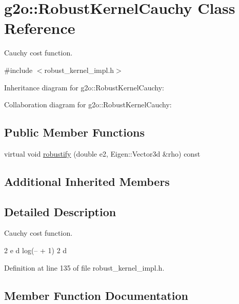 \hypertarget{classg2o_1_1RobustKernelCauchy}{}\section{g2o\+:\+:Robust\+Kernel\+Cauchy Class Reference}
\label{classg2o_1_1RobustKernelCauchy}


Cauchy cost function.  




{\ttfamily \#include $<$robust\+\_\+kernel\+\_\+impl.\+h$>$}



Inheritance diagram for g2o\+:\+:Robust\+Kernel\+Cauchy\+:


Collaboration diagram for g2o\+:\+:Robust\+Kernel\+Cauchy\+:
\subsection*{Public Member Functions}
\begin{DoxyCompactItemize}
\item 
virtual void \hyperlink{classg2o_1_1RobustKernelCauchy_adfe1678456e327b1a8a33f5b8b499493}{robustify} (double e2, Eigen\+::\+Vector3d \&rho) const 
\end{DoxyCompactItemize}
\subsection*{Additional Inherited Members}


\subsection{Detailed Description}
Cauchy cost function. 

2 e d log(-- + 1) 2 d 

Definition at line 135 of file robust\+\_\+kernel\+\_\+impl.\+h.



\subsection{Member Function Documentation}
